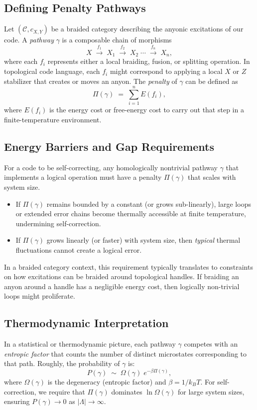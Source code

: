 \documentclass[12pt]{article}
\begin{document}
\subsection{Defining Penalty Pathways}
Let $(\mathcal{C}, c_{X,Y})$ be a braided category describing the anyonic excitations of our code. A \emph{pathway} $\gamma$ is a composable chain of morphisms
\[
X \;\xrightarrow{f_1}\; X_1 \;\xrightarrow{f_2}\; X_2 \;\cdots\;\xrightarrow{f_n}\; X_n,
\]
where each $f_i$ represents either a local braiding, fusion, or splitting operation. In topological code language, each $f_i$ might correspond to applying a local $X$ or $Z$ stabilizer that creates or moves an anyon. The \emph{penalty} of $\gamma$ can be defined as 
\[
\Pi(\gamma) \;=\; \sum_{i=1}^n E(f_i),
\]
where $E(f_i)$ is the energy cost or free-energy cost to carry out that step in a finite-temperature environment.

\subsection{Energy Barriers and Gap Requirements}
For a code to be self-correcting, any homologically nontrivial pathway $\gamma$ that implements a logical operation must have a penalty $\Pi(\gamma)$ that scales with system size. 
\begin{itemize}
    \item If $\Pi(\gamma)$ remains bounded by a constant (or grows sub-linearly), large loops or extended error chains become thermally accessible at finite temperature, undermining self-correction.
    \item If $\Pi(\gamma)$ grows linearly (or faster) with system size, then \emph{typical} thermal fluctuations cannot create a logical error. 
\end{itemize}
In a braided category context, this requirement typically translates to constraints on how excitations can be braided around topological handles. If braiding an anyon around a handle has a negligible energy cost, then logically non-trivial loops might proliferate.

\subsection{Thermodynamic Interpretation}
In a statistical or thermodynamic picture, each pathway $\gamma$ competes with an \emph{entropic factor} that counts the number of distinct microstates corresponding to that path. Roughly, the probability of $\gamma$ is:
\[
P(\gamma) \;\sim\; \Omega(\gamma)\; e^{-\beta \Pi(\gamma)},
\]
where $\Omega(\gamma)$ is the degeneracy (entropic factor) and $\beta = 1/k_B T$. For self-correction, we require that $\Pi(\gamma)$ dominates $\ln \Omega(\gamma)$ for large system sizes, ensuring $P(\gamma) \to 0$ as $| \Lambda | \to \infty$.
\end{document}
